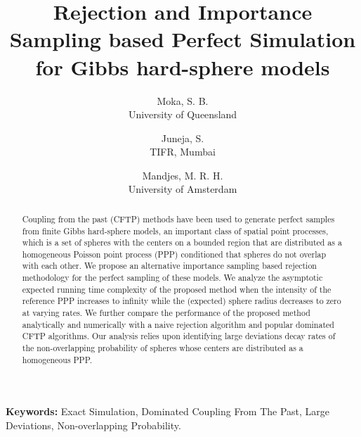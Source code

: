 \documentclass[11pt]{article}
\title{Rejection and Importance Sampling based Perfect Simulation for Gibbs hard-sphere models}
\author{
  Moka, S. B.\\ {\normalfont University of Queensland}\\
  \and
  Juneja, S.\\{\normalfont TIFR, Mumbai}\\
  \and
  Mandjes, M. R. H.\\ {\normalfont University of Amsterdam }
}
\date{}
\begin{document}
\maketitle


\begin{abstract}
Coupling from the past (CFTP) methods have been used to generate perfect samples from finite Gibbs hard-sphere models, an important class of spatial point processes, which is a set of spheres with the centers on a bounded region that are distributed as a homogeneous Poisson point process (PPP) conditioned that spheres do not overlap with each other. We propose an alternative importance sampling based rejection methodology  for the perfect sampling of these models.  We analyze the asymptotic expected running time complexity of the proposed method when the intensity of the reference PPP increases to infinity while the (expected) sphere radius decreases to zero at varying rates. We further compare the performance of the proposed method analytically and numerically with a naive rejection algorithm and popular dominated CFTP algorithms. Our analysis relies upon identifying large deviations decay rates of the non-overlapping probability of spheres whose centers are distributed as a homogeneous PPP.
\end{abstract}

{\bf Keywords:} Exact Simulation, Dominated Coupling From The Past, Large Deviations, Non-overlapping Probability.


\end{document}

